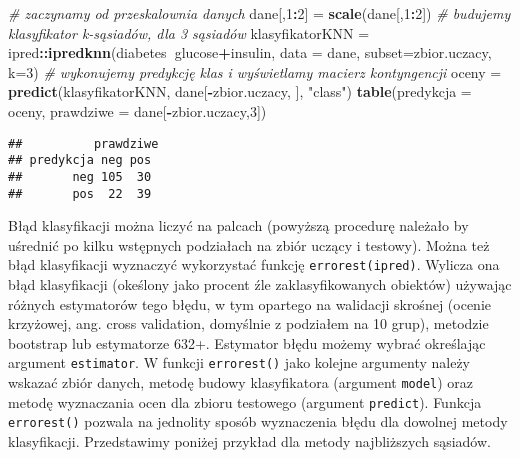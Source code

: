 \documentclass[polish,]{book}
\newenvironment{Shaded}{\begin{snugshade}}{\end{snugshade}}
\newcommand{\CommentTok}[1]{\textcolor[rgb]{0.56,0.35,0.01}{\textit{#1}}}
\newcommand{\DataTypeTok}[1]{\textcolor[rgb]{0.13,0.29,0.53}{#1}}
\newcommand{\DecValTok}[1]{\textcolor[rgb]{0.00,0.00,0.81}{#1}}
\newcommand{\KeywordTok}[1]{\textcolor[rgb]{0.13,0.29,0.53}{\textbf{#1}}}
\newcommand{\NormalTok}[1]{#1}
\newcommand{\OperatorTok}[1]{\textcolor[rgb]{0.81,0.36,0.00}{\textbf{#1}}}
\newcommand{\StringTok}[1]{\textcolor[rgb]{0.31,0.60,0.02}{#1}}
\begin{document}
\begin{Shaded}
\begin{Highlighting}[]
\CommentTok{# zaczynamy od przeskalownia danych}
\NormalTok{dane[,}\DecValTok{1}\OperatorTok{:}\DecValTok{2}\NormalTok{] =}\StringTok{ }\KeywordTok{scale}\NormalTok{(dane[,}\DecValTok{1}\OperatorTok{:}\DecValTok{2}\NormalTok{])}
\CommentTok{# budujemy klasyfikator k-sąsiadów, dla 3 sąsiadów}
\NormalTok{klasyfikatorKNN =}\StringTok{ }\NormalTok{ipred}\OperatorTok{::}\KeywordTok{ipredknn}\NormalTok{(diabetes}\OperatorTok{~}\NormalTok{glucose}\OperatorTok{+}\NormalTok{insulin, }
                                  \DataTypeTok{data =}\NormalTok{ dane, }\DataTypeTok{subset=}\NormalTok{zbior.uczacy, }\DataTypeTok{k=}\DecValTok{3}\NormalTok{)}
\CommentTok{# wykonujemy predykcję klas i wyświetlamy macierz kontyngencji}
\NormalTok{oceny =}\StringTok{ }\KeywordTok{predict}\NormalTok{(klasyfikatorKNN, dane[}\OperatorTok{-}\NormalTok{zbior.uczacy, ], }\StringTok{"class"}\NormalTok{)}
\KeywordTok{table}\NormalTok{(}\DataTypeTok{predykcja =}\NormalTok{ oceny, }\DataTypeTok{prawdziwe =}\NormalTok{ dane[}\OperatorTok{-}\NormalTok{zbior.uczacy,}\DecValTok{3}\NormalTok{])}
\end{Highlighting}
\end{Shaded}

\begin{verbatim}
##          prawdziwe
## predykcja neg pos
##       neg 105  30
##       pos  22  39
\end{verbatim}

Błąd klasyfikacji można liczyć na palcach (powyższą procedurę należało by uśrednić po kilku wstępnych podziałach na zbiór uczący i testowy). Można też błąd klasyfikacji wyznaczyć wykorzystać funkcję \texttt{errorest(ipred)}. Wylicza ona błąd klasyfikacji (okeślony jako procent źle zaklasyfikowanych obiektów) używając różnych
estymatorów tego błędu, w tym opartego na walidacji skrośnej (ocenie krzyżowej,
ang. cross validation, domyślnie z podziałem na 10 grup), metodzie bootstrap lub estymatorze 632+. Estymator błędu możemy wybrać określając argument \texttt{estimator}.
W funkcji \texttt{errorest()} jako kolejne argumenty należy wskazać zbiór danych, metodę
budowy klasyfikatora (argument \texttt{model}) oraz metodę wyznaczania ocen dla zbioru
testowego (argument \texttt{predict}). Funkcja \texttt{errorest()} pozwala na jednolity sposób
wyznaczenia błędu dla dowolnej metody klasyfikacji. Przedstawimy poniżej przykład
dla metody najbliższych sąsiadów.
\end{document}
